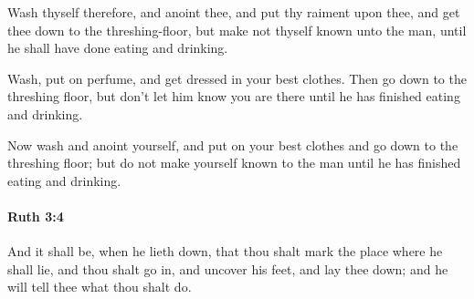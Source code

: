 			\begin{versebox}
					\item[BHS] 
					\item[LXX] 
					\item[ASV] Wash thyself therefore, and anoint thee, and put thy raiment upon thee, and get thee down to the threshing-floor, but make not thyself known unto the man, until he shall have done eating and drinking.
					\item[NIV] Wash, put on perfume, and get dressed in your best clothes. Then go down to the threshing floor, but don’t let him know you are there until he has finished eating and drinking.
					\item[NRSV] Now wash and anoint yourself, and put on your best clothes and go down to the threshing floor; but do not make yourself known to the man until he has finished eating and drinking.
			\end{versebox}

		\paragraph{Ruth 3:4} %
			\label{RUTH-3-4}

			And it shall be, when he lieth down, that thou shalt mark the place where he shall lie, and thou shalt go in, and uncover his feet, and lay thee down; and he will tell thee what thou shalt do.

